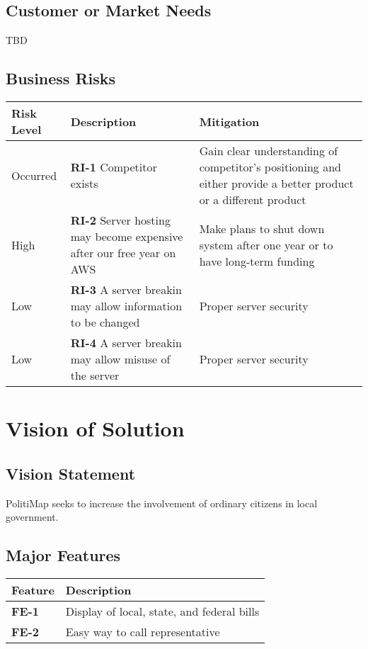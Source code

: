 \subsection{Customer or Market Needs}
TBD

\subsection{Business Risks}
\begin{tabu}{lXX}
  \toprule
  Risk Level & Description & Mitigation \\
  \midrule
  Occurred &
  \textbf{RI-1} Competitor exists &
  Gain clear
  understanding of competitor's positioning and either provide a
  better product or a different product\\

  High &
  \textbf{RI-2} Server hosting may become expensive after our
  free year on AWS &
  Make plans to shut down system after one year or to
  have long-term funding \\

  Low &
  \textbf{RI-3} A server breakin may allow information to be
  changed &
  Proper server security \\
  Low & \textbf{RI-4} A server breakin may allow misuse of the server
& Proper server security \\
  \bottomrule
\end{tabu}

\section{Vision of Solution}
\subsection{Vision Statement}
PolitiMap seeks to increase the involvement of ordinary citizens in
local government.

\subsection{Major Features}
\begin{tabu}{lX}
  \toprule
  Feature & Description\\
  \midrule
  \textbf{FE-1} & Display of local, state, and federal bills\\
  \textbf{FE-2} & Easy way to call representative\\
  \bottomrule
\end{tabu}

